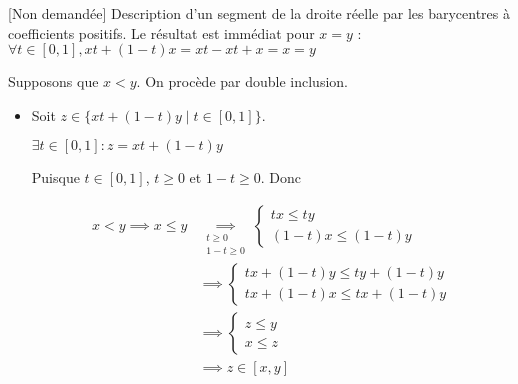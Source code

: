 \documentclass{article}
\begin{document}
\begin{question_kholle}[{
				Soient $(x, y) \in \R^2$ tels que $x \leqslant y$. $$[x, y] = \{z \in \R \mid x \leqslant z \leqslant y \} = \{tx + (1-t)y \mid t \in [0, 1]\}$$
			}]{[Non demandée] Description d'un segment de la droite réelle par les barycentres à coefficients positifs.}
	Le résultat est immédiat pour $x = y$ : $\forall t \in [0, 1], xt+(1-t)x = xt - xt +x =x = y$

	Supposons que $x <y$. On procède par double inclusion.
	\begin{itemize}[label=$\star$]
		\item Soit $z \in \{ xt+(1-t)y \mid t \in [0, 1] \}$.

		      $\exists t \in [0, 1] : z = xt+(1-t)y$

		      Puisque $t \in [0, 1]$, $t \geqslant 0$ et $1-t \geqslant 0$.
		      Donc

		      \begin{align*}
			      x < y \implies x\leqslant y & \underset{ \substack{t \geqslant 0                  \\1-t \geqslant 0} }{ \implies } \left\{ \begin{array}{ll}
				      tx \leqslant ty \\
				      (1-t)x \leqslant (1-t)y
			      \end{array}\right. \\
			                                  & \implies \left\{ \begin{array}{ll}
				                                                     tx + (1-t)y \leqslant ty + (1-t) y \\
				                                                     tx + (1-t)x  \leqslant tx + (1-t)y
			                                                     \end{array}\right. \\
			                                  & \implies \left\{ \begin{array}{ll}
				                                                     z \leqslant y \\
				                                                     x \leqslant z
			                                                     \end{array}\right.                 \\
			                                  & \implies z \in[x, y]
		      \end{align*}




\end{itemize}
\end{question_kholle}
\end{document}
